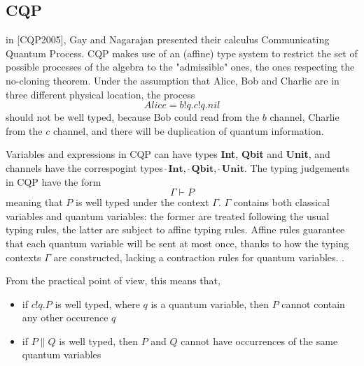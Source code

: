 
\subsection{CQP}

in [CQP2005], Gay and Nagarajan presented their calculus Communicating Quantum Process. CQP makes use of an (affine) type system to restrict the set of possible processes of the algebra to the "admissible" ones, the ones respecting the no-cloning theorem. Under the assumption that Alice, Bob and Charlie are in three different physical location, the process \[Alice = b!q.c!q.nil\] should not be well typed, because Bob could read from the $b$ channel, Charlie from the $c$ channel, and there will be duplication of quantum information.


Variables and expressions in CQP can have types \textbf{Int}, \textbf{Qbit} and \textbf{Unit}, and channels have the correspogint types $\widehat{\ }\textbf{Int}$, $\widehat{\ }\textbf{Qbit}$, $\widehat{\ }\textbf{Unit}$.
The typing judgements in CQP have the form \[\Gamma \vdash P\] meaning that $P$ is well typed under the context $\Gamma$. $\Gamma$ contains both classical variables and quantum variables: the former are treated following the usual typing rules, the latter are subject to affine typing rules. Affine rules guarantee that each quantum variable will be sent at most once, thanks to how the typing contexts $\Gamma$ are constructed, lacking a contraction rules for quantum variables. .


From the practical point of view, this means that, \begin{itemize} 
\item if $c!q.P$ is well typed, where $q$ is a quantum variable, then $P$ cannot contain any other occurence $q$
\item if $P \parallel Q$ is well typed, then $P$ and $Q$ cannot have occurrences of the same quantum variables
\end{itemize}



